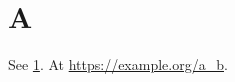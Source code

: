 \documentclass{article}
\begin{document}
\section{A}\label{s}
\makeatletter
See \cref{s}. At \url{https://example.org/a_b}. 
\end{document}
